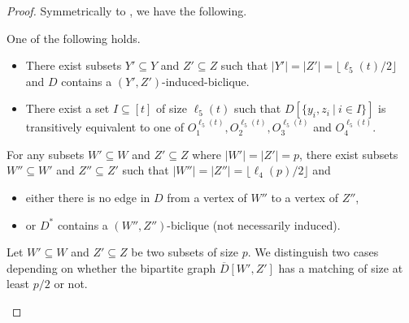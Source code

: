 \begin{proof}
Symmetrically to , we have the following.

\begin{claim}
\label{clm:ramseyB}
One of the following holds.
\begin{itemize}
\item[(1)] There exist subsets $Y' \subseteq Y$ and $Z' \subseteq Z$ such that $|Y'| = |Z'| = \lfloor \ell_5(t)/2 \rfloor$ and $D$ contains a $(Y',Z')$-induced-biclique.
\item[(2)] There exist a set $I \subseteq [t]$ of size $\ell_5(t)$ such that $D[\{y_i,z_i~|~i \in I\}]$ is transitively equivalent to one of $O_1^{\ell_5(t)},O_2^{\ell_5(t)},O_3^{\ell_5(t)}$ and $O_4^{\ell_5(t)}$.
\end{itemize}
\end{claim}

\begin{claim}
\label{clm:ramseyWZ}
For any subsets $W' \subseteq W$ and $Z' \subseteq Z$ where $|W'| = |Z'| = p$, there exist subsets 
$W'' \subseteq W'$ and $Z'' \subseteq Z'$ such that $|W''| = |Z''| = \lfloor \ell_4(p) / 2 \rfloor$ and
\begin{itemize}
\item[$\bullet$] either there is no edge in $D$ from a vertex of $W''$ to a vertex of $Z''$,
\item[$\bullet$] or $D^*$ contains a $(W'',Z'')$-biclique (not necessarily induced).
\end{itemize}
\end{claim}

\begin{claimproof}
Let $W' \subseteq W$ and $Z' \subseteq Z$ be two subsets of size $p$. We distinguish two cases depending on whether the bipartite graph $\overline{D}[W',Z']$ has a matching of size at least $p/2$ or not.


\end{claimproof}
\end{proof}
